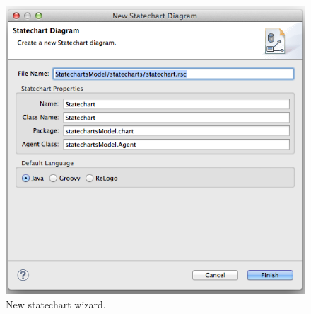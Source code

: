\documentclass[11pt]{amsart}
\begin{document}
\begin{figure}
\begin{center}
\vspace{.2in}
\centerline {
\includegraphics[width=5in]{StatechartsImages/NewStatechartWizard.png}
}
\caption{New statechart wizard.}
\label{fig:newStatechartWizard}
\end{center}
\end{figure}
\end{document}

